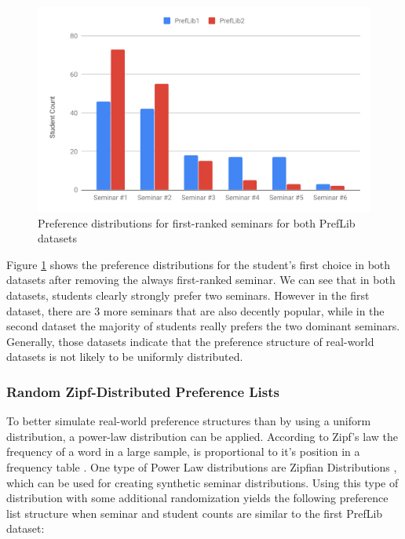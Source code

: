 \begin{figure}[h!]
    \centering
    \includegraphics[width=0.8\linewidth]{assets/plots/prelib-distr.pdf}
    \caption{Preference distributions for first-ranked seminars for both PrefLib datasets}
    \label{fig:preflib-distribution}
\end{figure}

Figure \ref{fig:preflib-distribution} shows the preference distributions for the student's first choice in both datasets after removing the always first-ranked seminar. We can see that in both datasets, students clearly strongly prefer two seminars. However in the first dataset, there are 3 more seminars that are also decently popular, while in the second dataset the majority of students really prefers the two dominant seminars. Generally, those datasets indicate that the preference structure of real-world datasets is not likely to be uniformly distributed.

\subsubsection{Random Zipf-Distributed Preference Lists}
To better simulate real-world preference structures than by using a uniform distribution, a power-law distribution can be applied. According to Zipf's law the frequency of a word in a large sample, is proportional to it's position in a frequency table \cite{Zipf}. One type of Power Law distributions are Zipfian Distributions \cite{Zipf}, which can be used for creating synthetic seminar distributions. Using this type of distribution with some additional randomization yields the following preference list structure when seminar and student counts are similar to the first PrefLib dataset:

